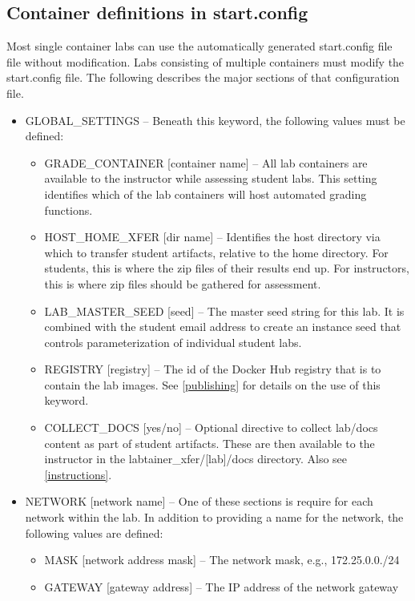 \documentclass[12pt]{article}
\begin{document}
\subsection{Container definitions in start.config}
\label{start.config}
Most single container labs can use the automatically generated start.config file file
without modification.  Labs consisting of multiple containers must modify the start.config 
file.  The following describes the major sections of that configuration file.
\begin{itemize}
\item GLOBAL\_SETTINGS -- Beneath this keyword, the following values must be defined:

\begin{itemize}
\item GRADE\_CONTAINER [container name] -- All lab containers are available to the instructor while assessing student labs.
This setting identifies which of the lab containers will host automated grading functions.
\item HOST\_HOME\_XFER [dir name] --  Identifies the host directory via which to transfer student artifacts, relative to 
the home directory.  For students, this is where the zip files of their results end up.  For instructors, this is
where zip files should be gathered for assessment.
\item LAB\_MASTER\_SEED [seed] -- The master seed string for this lab.  It is combined with the student email
address to create an instance seed that controls parameterization of individual student labs.
\item REGISTRY [registry] -- The id of the Docker Hub registry that is to contain the lab images.
See \ref{publishing} for details on the use of this keyword.
\item COLLECT\_DOCS [yes/no] -- Optional directive to collect lab/docs content as part of student artifacts.
These are then available to the instructor in the labtainer\_xfer/[lab]/docs directory.  Also see \ref{instructions}.
\end{itemize}

\item NETWORK [network name] -- One of these sections is require for each network within the lab.  In addition to
providing a name for the network, the following values are defined:

\begin{itemize}
\item MASK [network address mask] -- The network mask, e.g., 172.25.0.0./24
\item GATEWAY [gateway address] -- The IP address of the network gateway
\end{itemize}


\end{itemize}
\end{document}
